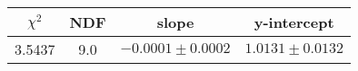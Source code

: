 \begin{tabular}{|c|c|c|c|}

\hline
$\chi^{2}$ & NDF & slope & y-intercept  \\
\hline
3.5437 & 9.0 & $-0.0001\pm0.0002$ & $1.0131\pm0.0132$ \\
\hline

\end{tabular}
